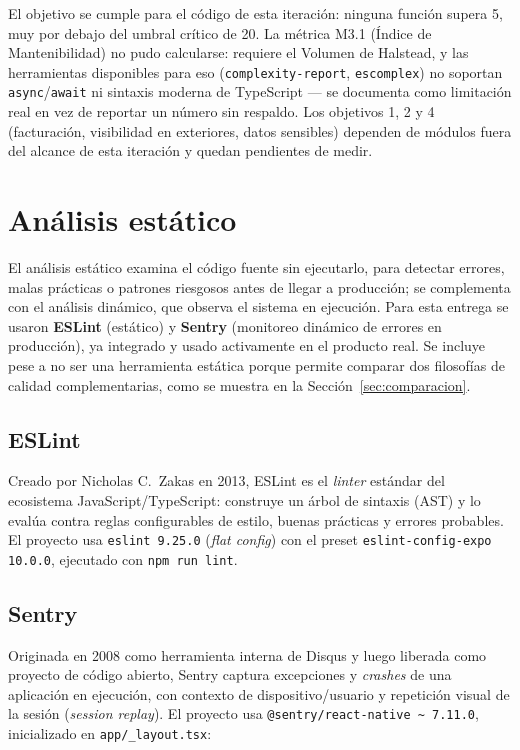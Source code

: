 \documentclass[11pt,a4paper]{article}
\begin{document}
El objetivo se cumple para el código de esta iteración: ninguna función supera 5, muy por
debajo del umbral crítico de 20. La métrica M3.1 (Índice de Mantenibilidad) no pudo
calcularse: requiere el Volumen de Halstead, y las herramientas disponibles para eso
(\texttt{complexity-report}, \texttt{escomplex}) no soportan \texttt{async}/\texttt{await} ni
sintaxis moderna de TypeScript --- se documenta como limitación real en vez de reportar un
número sin respaldo. Los objetivos 1, 2 y 4 (facturación, visibilidad en exteriores, datos
sensibles) dependen de módulos fuera del alcance de esta iteración y quedan pendientes de
medir.

\section{Análisis estático}
\label{sec:analisis-estatico}

El análisis estático examina el código fuente sin ejecutarlo, para detectar errores,
malas prácticas o patrones riesgosos antes de llegar a producción; se complementa con el
análisis dinámico, que observa el sistema en ejecución. Para esta entrega se usaron
\textbf{ESLint} (estático) y \textbf{Sentry} (monitoreo dinámico de errores en producción),
ya integrado y usado activamente en el producto real. Se incluye pese a no ser una
herramienta estática porque permite comparar dos filosofías de calidad complementarias, como
se muestra en la Sección~\ref{sec:comparacion}.

\subsection{ESLint}

Creado por Nicholas C.\ Zakas en 2013, ESLint es el \textit{linter} estándar del ecosistema
JavaScript/TypeScript: construye un árbol de sintaxis (AST) y lo evalúa contra reglas
configurables de estilo, buenas prácticas y errores probables. El proyecto usa
\texttt{eslint 9.25.0} (\textit{flat config}) con el preset \texttt{eslint-config-expo
10.0.0}, ejecutado con \texttt{npm run lint}.

\subsection{Sentry}

Originada en 2008 como herramienta interna de Disqus y luego liberada como proyecto de
código abierto, Sentry captura excepciones y \textit{crashes} de una aplicación en
ejecución, con contexto de dispositivo/usuario y repetición visual de la sesión
(\textit{session replay}). El proyecto usa \texttt{@sentry/react-native \textasciitilde
7.11.0}, inicializado en \texttt{app/\_layout.tsx}:
\end{document}
